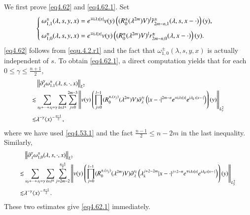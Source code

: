\documentclass[11pt,reqno]{amsart}
\def\R {\mathbb{R}}
\def\d{{\rm d}}
\def\i{{\rm i}}
\numberwithin{equation}{section}
\theoremstyle{definition}
\begin{document}
\begin{appendix}
	We first prove \eqref{eq4.62} and \eqref{eq4.62.1}. Set
	\begin{equation*}\label{equ4.8.2}
		\begin{cases}
			\omega_{1,1}^{\pm}(\lambda,s,y,x)
			=e^{\mp \i\lambda s|x|}v(y)\left((R_{0}^{\pm}(\lambda^{2m})V)^{l}\tilde{r}^{\pm}_{2m-n, 1}(\lambda, s, x-\cdot)\right)(y),  \\[0.25cm]
			\omega_{1,0}^{\pm}(\lambda,s,y,x)=e^{\mp \i\lambda |x|}v(y)\left((R_{0}^{\pm}(\lambda^{2m})V)^{l}r^{\pm}_{2m-n, 0}(\lambda, x-\cdot)\right)(y).
		\end{cases}
	\end{equation*}
	\eqref{eq4.62} follows from \eqref{equ.4.2.r1} and the fact that $\omega_{1,0}^{\pm}(\lambda,s,y,x)$ is actually independent of $s$. To obtain \eqref{eq4.62.1}, a direct computation yields that for each $0\le \gamma\le\frac{n+1}{2}$,
		\begin{equation*}\small
			\begin{aligned}
				&\left\| \partial_{\lambda}^{\gamma}\omega_{1,1}^{\pm}(\lambda,s,\cdot,x) \right\|_{L^2}\\
				 \lesssim&\sum_{s_0+\cdots+s_l=\gamma}\sum_{k\in I^{\pm}}\sum_{j=0}^{2m-3}
				\left\|v(y) \left(\prod_{j=0}^{l-1}(R_{0}^{\pm,(s_{j})}(\lambda^{2m})V)\partial_\lambda^{s_l}\left(|x-\cdot|^{2m-n}e^{\mp \i\lambda s|x|}e^{\i\lambda_{k}s|x-\cdot|}  \right)\right)(y)\right\|_{L^2_y}\\
				\lesssim&\lambda^{-\gamma}\langle x\rangle^{-\frac{n-1}{2}},
			\end{aligned}
		\end{equation*}
	where we have used  \eqref{eq4.53.1} and the fact $\frac{n-1}{2}\le n-2m$ in  the last inequality.
	Similarly,
		\begin{equation*}\small
			\begin{aligned}
				&\left\| \partial_{\lambda}^{\gamma}\omega_{1,0}^{\pm}(\lambda,s,\cdot,x) \right\|_{L^2} \\
				\lesssim&\sum_{s_0+\cdots+s_l=\gamma}\sum_{k\in I^{\pm}}\sum_{j=2m-2}^{\frac{n-3}{2}}
				\left\|v(y) \left(\prod_{j=0}^{l-1}(R_{0}^{\pm,(s_{j})}(\lambda^{2m})V)\partial_\lambda^{s_l}\left(\lambda_k^{j+2-2m}|x-\cdot|^{j+2-n}e^{\mp \i\lambda s|x|}e^{\i\lambda_{k}s|x-\cdot|}  \right)\right)(y)\right\|_{L^2_y}\\
				\lesssim&\lambda^{-\gamma}\langle x\rangle^{-\frac{n-1}{2}}.
			\end{aligned}
		\end{equation*}
	These two estimates give \eqref{eq4.62.1} immediately.
	

\end{appendix}
\end{document}
